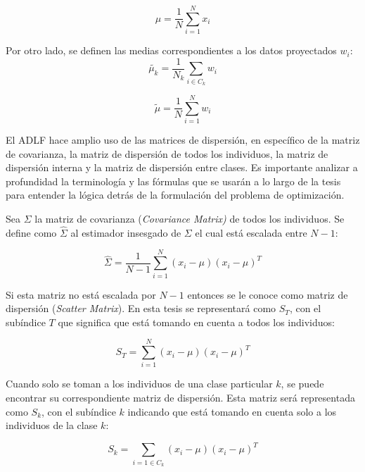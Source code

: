 \begin{equation} \label{eq:19}
 \mu = \frac{1}{N} \sum_{i = 1}^{N} x_i
\end{equation}

Por otro lado, se definen las medias correspondientes a los datos proyectados $w_i$:
\begin{equation} \label{eq:20}
  \widetilde{\mu_k} = \frac{1}{N_{k}} 
  \sum_{i \in C_k}
                  w_i
\end{equation} 

\begin{equation} \label{eq:21}
 \widetilde{\mu} = \frac{1}{N} \sum_{i = 1}^{N} w_i
\end{equation}

El ADLF hace amplio uso de las matrices de dispersión, en específico de la matriz de covarianza, la matriz de dispersión de todos los individuos, la matriz de dispersión interna y la matriz de dispersión entre clases. Es importante analizar a profundidad la terminología y las fórmulas que se usarán a lo largo de la tesis para entender la lógica detrás de la formulación del problema de optimización.

Sea $\Sigma$ la matriz de covarianza (\textit{Covariance Matrix)} de todos los individuos. Se define como $\widehat{\Sigma}$ al estimador insesgado de $\Sigma$ el cual está escalada entre $N-1$:

\begin{equation} \label{eq:2.1}
\widehat{\Sigma} = \frac{1}{N-1} \sum_{i=1}^{N}(x_i - \mu)(x_i - \mu)^T	
\end{equation}

Si esta matriz no está escalada por $N-1$ entonces se le conoce como matriz de dispersión (\textit{Scatter Matrix}). En esta tesis se representará como $S_T$, con el subíndice $T$ que significa que está tomando en cuenta a todos los individuos:

\begin{equation} \label{eq:2.2}
S_T = \sum_{i=1}^{N}(x_i - \mu)(x_i - \mu)^T	
\end{equation}

Cuando solo se toman a los individuos de una clase particular $k$, se puede encontrar su correspondiente matriz de dispersión. Esta matriz será representada como $S_k$, con el subíndice $k$ indicando que está tomando en cuenta solo a los individuos de la clase $k$:

\begin{equation*}
S_k = \sum_{i=1 \in C_k} (x_i - \mu)(x_i - \mu)^T	
\end{equation*}

